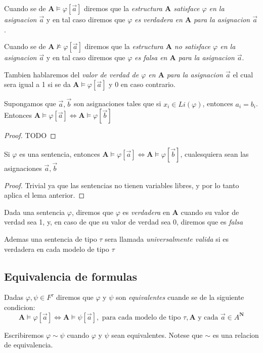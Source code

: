 \begin{definition}
  Cuando se de $\mathbf{A}\models\varphi[\vec{a}]$ diremos que la \emph{estructura $\mathbf{A}$ satisface $\varphi$ en la asignacion $\vec{a}$} y en tal caso
  diremos que $\varphi$ \emph{es verdadera en $\mathbf{A}$ para la asignacion $\vec{a}$}.

  Cuando se de $\mathbf{A}\not\models\varphi[\vec{a}]$ diremos que la \emph{estructura $\mathbf{A}$ no satisface $\varphi$ en la asignacion $\vec{a}$} y en tal caso
  diremos que $\varphi$ \emph{es falsa en $\mathbf{A}$ para la asignacion $\vec{a}$}.

  Tambien hablaremos del \emph{valor de verdad de $\varphi$ en $\mathbf{A}$ para la asignacion $\vec{a}$} el cual sera 
  igual a 1 si se da $\mathbf{A}\models\varphi[\vec{a}]$ y 0 en caso contrario.
\end{definition}

\begin{lemma}
  Supongamos que $\vec{a}, \vec{b}$ son asignaciones tales que si $x_i \in Li(\varphi)$, entonces $a_i = b_i$. Entonces
  $\mathbf{A}\models\varphi[\vec{a}] \iff \mathbf{A}\models\varphi[\vec{b}]$
\end{lemma}
\begin{proof}
  TODO
\end{proof}
\begin{corollary}
  Si $\varphi$ es una sentencia, entonces $\mathbf{A}\models\varphi[\vec{a}] \iff \mathbf{A}\models\varphi[\vec{b}]$, cualesquiera sean 
  las asignaciones $\vec{a}, \vec{b}$
\end{corollary}
\begin{proof}
  Trivial ya que las sentencias no tienen variables libres, y por lo tanto aplica el lema anterior.
\end{proof}

\begin{definition}
  Dada una sentencia $\varphi$, diremos que $\varphi$ es \emph{verdadera} en $\mathbf{A}$ cuando su valor de verdad sea 1, y, en caso de que 
  su valor de verdad sea 0, diremos que es \emph{falsa}

  Ademas una sentencia de tipo $\tau$ sera llamada \emph{universalmente valida} si es verdadera en cada modelo de tipo $\tau$
\end{definition}

\subsection{Equivalencia de formulas}
\begin{definition}
  Dadas $\varphi, \psi \in F^\tau$ diremos que $\varphi$ y $\psi$ son \emph{equivalentes} cuande se de la siguiente condicion:
  $$
  \mathbf{A} \models \varphi[\vec{a}] \iff \mathbf{A} \models \psi[\vec{a}], \text{ para cada modelo de tipo } \tau, \mathbf{A} \text{ y cada } \vec{a} \in A^\mathbf{N}
  $$  
  
  Escribiremos $\varphi \sim \psi$ cuando $\varphi$ y $\psi$ sean equivalentes. Notese que $\sim$ es una relacion de equivalencia.
\end{definition}

